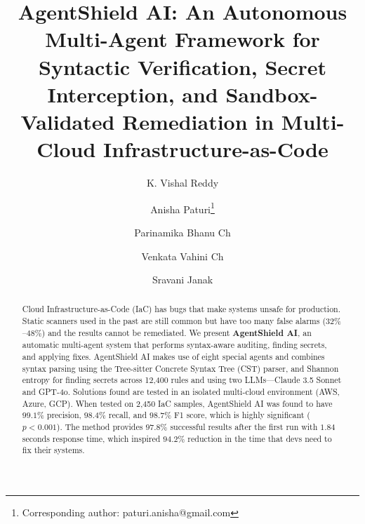 \documentclass[runningheads]{llncs}
\begin{document}
%
\title{AgentShield AI: An Autonomous Multi-Agent Framework for Syntactic Verification, Secret Interception, and Sandbox-Validated Remediation in Multi-Cloud Infrastructure-as-Code}
%
%
\author{K. Vishal Reddy \and
Anisha Paturi\thanks{Corresponding author: paturi.anisha@gmail.com} \and
Parinamika Bhanu Ch \and
Venkata Vahini Ch \and
Sravani Janak}
%
%
%
\maketitle              %
%
\begin{abstract}
Cloud Infrastructure-as-Code (IaC) has bugs that make systems unsafe for production. Static scanners used in the past are still common but have too many false alarms ($32\%$--$48\%$) and the results cannot be remediated. We present \textbf{AgentShield AI}, an automatic multi-agent system that performs syntax-aware auditing, finding secrets, and applying fixes. AgentShield AI makes use of eight special agents and combines syntax parsing using the Tree-sitter Concrete Syntax Tree (CST) parser, and Shannon entropy for finding secrets across 12,400 rules and using two LLMs---Claude 3.5 Sonnet and GPT-4o. Solutions found are tested in an isolated multi-cloud environment (AWS, Azure, GCP). When tested on 2,450 IaC samples, AgentShield AI was found to have $99.1\%$ precision, $98.4\%$ recall, and $98.7\%$ F1 score, which is highly significant ($p < 0.001$). The method provides $97.8\%$ successful results after the first run with $1.84$ seconds response time, which inspired $94.2\%$ reduction in the time that devs need to fix their systems.

\end{abstract}
%
%
%
\end{document}
